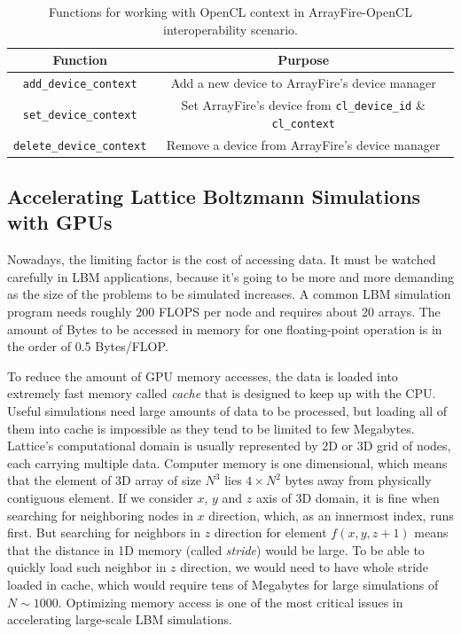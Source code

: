 \begin{table}[h!]
	\centering\small
	{\renewcommand{\arraystretch}{1.1}%
		{\setlength{\tabcolsep}{0.4em}
	\begin{tabular}{|c|c|} 
		\hline
		Function & Purpose \\
		\hline
		\texttt{add_device_context} & Add a new device to ArrayFire's device manager \\ 
		\hline
		\texttt{set_device_context} & Set ArrayFire's device from \texttt{cl_device_id} \& \texttt{cl_context} \\
		\hline
		\texttt{delete_device_context} & Remove a device from ArrayFire's device manager \\
		\hline
	\end{tabular}}}
	\caption{Functions for working with OpenCL context in ArrayFire-OpenCL interoperability scenario.}
	\label{table:afcl}
\end{table}

\subsection{Accelerating Lattice Boltzmann Simulations with GPUs}

Nowadays, the limiting factor is the cost of accessing data. It must be watched carefully in LBM applications, because it's going to be more and more demanding as the size of the problems to be simulated increases. A common LBM simulation program needs roughly 200 FLOPS per node and requires about 20 arrays. The amount of Bytes to be accessed in memory for one floating-point operation is in the order of 0.5 Bytes/FLOP. 

To reduce the amount of GPU memory accesses, the data is loaded into extremely fast memory called \emph{cache} that is designed to keep up with the CPU. Useful simulations need large amounts of data to be processed, but loading all of them into cache is impossible as they tend to be limited to few Megabytes. Lattice's computational domain is usually represented by 2D or 3D grid of nodes, each carrying multiple data. Computer memory is one dimensional, which means that the element of 3D array of size $N^3$ lies $4 \times N^2$ bytes away from physically contiguous element. If we consider $x$, $y$ and $z$ axis of 3D domain, it is fine when searching for neighboring nodes in $x$ direction, which, as an innermost index, runs first. But searching for neighbors in $z$ direction for element $f(x,y,z+1)$ means that the distance in 1D memory (called \emph{stride}) would be large. To be able to quickly load such neighbor in $z$ direction, we would need to have whole stride loaded in cache, which would require tens of Megabytes for large simulations of $N \sim 1000$. Optimizing memory access is one of the most critical issues in accelerating large-scale LBM simulations.

